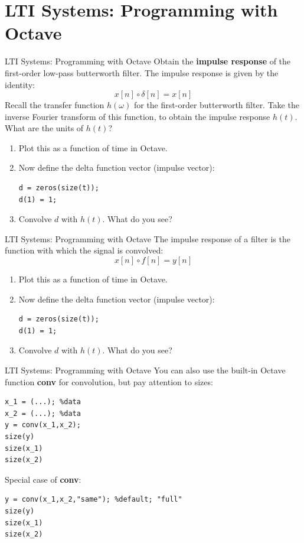 \documentclass{beamer}
\begin{document}
\section{LTI Systems: Programming with Octave}

\begin{frame}[fragile]{LTI Systems: Programming with Octave}
\small
Obtain the \textbf{\alert{impulse response}} of the first-order low-pass butterworth filter.  The impulse response is given by the identity:
\begin{equation}
x[n] \circ \delta[n] = x[n] \label{eq:impulse}
\end{equation}
Recall the transfer function $h(\omega)$ for the first-order butterworth filter.  Take the inverse Fourier transform of this function, to obtain the impulse response $h(t)$.  What are the units of $h(t)$?
\begin{enumerate}
\item Plot this as a function of time in Octave.
\item Now define the delta function vector (impulse vector):
\begin{verbatim}
d = zeros(size(t));
d(1) = 1;
\end{verbatim}
\item Convolve $d$ with $h(t)$.  What do you see?
\end{enumerate}
\end{frame}

\begin{frame}[fragile]{LTI Systems: Programming with Octave}
\small
The impulse response of a filter is the function with which the signal is convolved:
\begin{equation}
x[n] \circ f[n] = y[n] \label{eq:impulse2}
\end{equation}
\begin{enumerate}
\item Plot this as a function of time in Octave.
\item Now define the delta function vector (impulse vector):
\begin{verbatim}
d = zeros(size(t));
d(1) = 1;
\end{verbatim}
\item Convolve $d$ with $h(t)$.  What do you see?
\end{enumerate}
\end{frame}

\begin{frame}[fragile]{LTI Systems: Programming with Octave}
\small
You can also use the built-in Octave function \textbf{conv} for convolution, but pay attention to sizes:
\begin{verbatim}
x_1 = (...); %data
x_2 = (...); %data
y = conv(x_1,x_2);
size(y)
size(x_1)
size(x_2)
\end{verbatim}
Special case of \textbf{conv}:
\begin{verbatim}
y = conv(x_1,x_2,"same"); %default; "full"
size(y)
size(x_1)
size(x_2)
\end{verbatim}
\end{frame}
\end{document}
